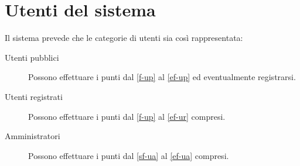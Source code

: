 \section{Utenti del sistema}
Il sistema prevede che le categorie di utenti sia così rappresentata:

\begin{description}
	
	\item[Utenti pubblici] Possono effettuare i punti dal \ref{f-up} al \ref{ef-up} ed eventualmente registrarsi.
	
	\item[Utenti registrati] Possono effettuare i punti dal \ref{f-up} al \ref{ef-ur} compresi.
	
	\item[Amministratori] Possono effettuare i punti dal \ref{sf-ua} al \ref{ef-ua} compresi.
	
\end{description}